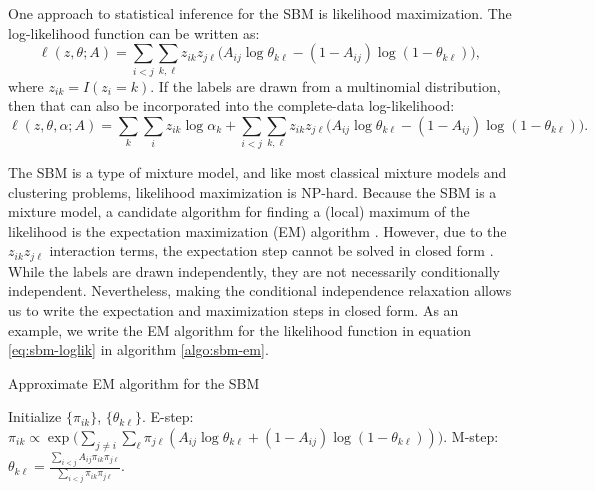 \documentclass[
  11pt,
]{article}
\theoremstyle{definition}
\theoremstyle{definition}
\theoremstyle{definition}
\theoremstyle{definition}
\theoremstyle{remark}
\begin{document}
One approach to statistical inference for the SBM is likelihood maximization.
The log-likelihood function can be written as:
\begin{equation}
\label{eq:sbm-loglik}
\ell(z, \theta; A) = \sum_{i < j} \sum_{k, \ell} z_{ik} z_{j \ell} \big( 
A_{ij} \log \theta_{k \ell} - (1 - A_{ij}) \log (1 - \theta_{k \ell}) \big),
\end{equation}
where \(z_{ik} = I(z_i = k)\). If the labels are drawn from a multinomial distribution, then that can also be incorporated into the complete-data log-likelihood:
\begin{equation}
\label{eq:sbm-loglik-full}
\ell(z, \theta, \alpha; A) = \sum_k \sum_i z_{ik} \log \alpha_k + 
\sum_{i < j} \sum_{k, \ell} z_{ik} z_{j \ell} \big( 
A_{ij} \log \theta_{k \ell} - (1 - A_{ij}) \log (1 - \theta_{k \ell}) \big).
\end{equation}

The SBM is a type of mixture model, and like most classical mixture models and clustering problems, likelihood maximization is NP-hard.
Because the SBM is a mixture model, a candidate algorithm for finding a (local) maximum of the likelihood is the expectation maximization (EM) algorithm \citep{10.2307/2984875}.
However, due to the \(z_{ik} z_{j \ell}\) interaction terms, the expectation step cannot be solved in closed form \citep{kolaczyk2014statistical}.
While the labels are drawn independently, they are not necessarily conditionally independent.
Nevertheless, making the conditional independence relaxation allows us to write the expectation and maximization steps in closed form.
As an example, we write the EM algorithm for the likelihood function in equation \ref{eq:sbm-loglik} in algorithm \ref{algo:sbm-em}.

\begin{algorithm}
\label{algo:sbm-em}
  \DontPrintSemicolon
  \SetAlgoLined
  \caption{Approximate EM algorithm for the SBM}
  Initialize $\{\pi_{ik}\}$, $\{\theta_{k \ell}\}$.\;
  \While{$\|\nabla \ell\| > \epsilon$} {
     {
       {
        E-step: $\pi_{ik} \propto \exp \bigg( \sum_{j \neq i} \sum_{\ell} \pi_{j \ell} (A_{ij} \log \theta_{k \ell} + (1 - A_{ij}) \log (1 - \theta_{k \ell})) \bigg)$.\;
        M-step: $\theta_{k \ell} = \frac{\sum_{i < j} A_{ij} \pi_{ik} \pi_{j \ell}}{\sum_{i < j} \pi_{ik} \pi_{j \ell}}$.\;
      }
    }
  }
\end{algorithm}
\end{document}
